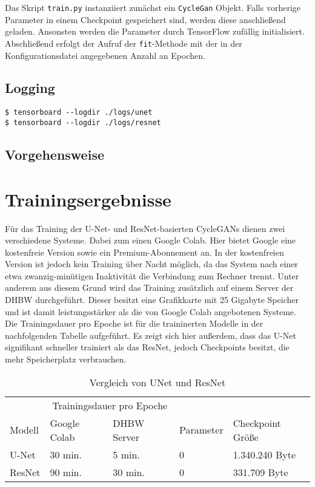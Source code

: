 Das Skript \texttt{train.py} instanziiert zunächst ein \texttt{CycleGan} Objekt. Falls vorherige Parameter in einem Checkpoint gespeichert sind, werden diese anschließend geladen. Ansonsten werden die Parameter durch TensorFlow zufällig initialisiert. Abschließend erfolgt der Aufruf der \texttt{fit}-Methode mit der in der Konfigurationsdatei angegebenen Anzahl an Epochen.

\subsection{Logging}

\begin{code}
   \begin{verbatim}
$ tensorboard --logdir ./logs/unet
$ tensorboard --logdir ./logs/resnet
   \end{verbatim}
\end{code}

\subsection{Vorgehensweise}

\section{Trainingsergebnisse}

Für das Training der U-Net- und ResNet-basierten \acp{CycleGAN} dienen zwei verschiedene Systeme. Dabei zum einen Google Colab. Hier bietet Google eine kostenfreie Version sowie ein Premium-Abonnement an. In der kostenfreien Version ist jedoch kein Training über Nacht möglich, da das System nach einer etwa zwanzig-minütigen Inaktivität die Verbindung zum Rechner trennt. Unter anderem aus diesem Grund wird das Training zusätzlich auf einem Server der DHBW durchgeführt. Dieser besitzt eine Grafikkarte mit 25 Gigabyte Speicher und ist damit leistungsstärker als die von Google Colab angebotenen Systeme. Die Trainingsdauer pro Epoche ist für die traininerten Modelle in der nachfolgenden Tabelle aufgeführt. Es zeigt sich hier außerdem, dass das U-Net signifikant schneller trainiert als das ResNet, jedoch Checkpoints besitzt, die mehr Speicherplatz verbrauchen. 

\begin{table}[H]
   \centering
   \begin{tabular}{lllll}
   \toprule
   & \multicolumn{2}{c}{Trainingsdauer pro Epoche} & \\
   
   \cmidrule(r){2-3}
   
   Modell & Google Colab & DHBW Server & Parameter & Checkpoint Größe \\
   \midrule
   U-Net & 30 min. & 5 min. & 0 & 1.340.240 Byte \\
   ResNet & 90 min. & 30 min. & 0 & 331.709 Byte \\
   \bottomrule
    \end{tabular}
    \caption{Vergleich von UNet und ResNet}
\end{table}

